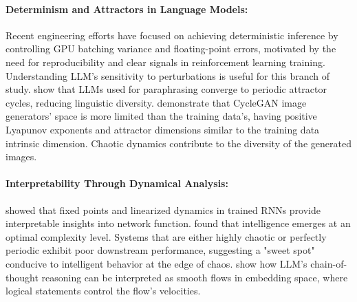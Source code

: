 \documentclass[a4paper,12pt]{article}
\begin{document}
\paragraph{Determinism and Attractors in Language Models:}
\cite{he2025nondeterminism}
Recent engineering efforts have focused on achieving deterministic inference by controlling GPU batching variance and floating-point errors, motivated by the need for reproducibility and clear signals in reinforcement learning training. Understanding LLM's sensitivity to perturbations is useful for this branch of study.
\cite{wang2025unveiling_attractor_cycles} show that LLMs used for paraphrasing converge to periodic attractor cycles, reducing linguistic diversity.
\cite{cyclegan} %
demonstrate that CycleGAN image generators' space is more limited than the training data's, having positive Lyapunov exponents and attractor dimensions similar to the training data intrinsic dimension. Chaotic dynamics contribute to the diversity of the generated images.

\paragraph{Interpretability Through Dynamical Analysis:}
\label{par:interpretability_dynamics}
\cite{sussillo2013} showed that fixed points and linearized dynamics in trained RNNs provide interpretable insights into network function. \cite{zhang2024intelligence_edge_of_chaos} found that intelligence emerges at an optimal complexity level. Systems that are either highly chaotic or perfectly periodic exhibit poor downstream performance, suggesting a "sweet spot" conducive to intelligent behavior at the edge of chaos. \cite{zhou2025geometryreasoningflowinglogics} show how LLM's chain-of-thought reasoning can be interpreted as smooth flows in embedding space, where logical statements control the flow's velocities.
\end{document}
